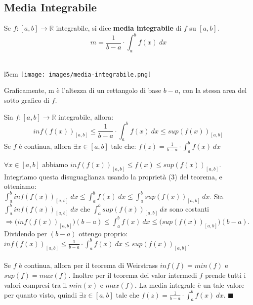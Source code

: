 \subsection{Media Integrabile}
\begin{definition}
Se $f: [a,b] \to \mathbb{R}$ integrabile, si dice \textbf{media integrabile} di $f$ su $[a,b]$.
\vspace{-10pt}
\[m = \frac{1}{b-a} \cdot \int_a^b f(x) \:dx\]\\
\end{definition}
\begin{wrapfigure}[2]{l}{5cm}
\vspace{-45pt}
    \centering
    \texttt{[image: images/media-integrabile.png]}
\end{wrapfigure}
\vspace{-10pt}
Graficamente, m è l'altezza di un rettangolo di base $b-a$, con la stessa area del sotto grafico di $f$.
\vspace{15pt}
\begin{theorem}
Sia $f:[a,b] \to \mathbb{R}$ integrabile, allora:
\vspace{-5pt}
\[inf(f(x))_{[a,b]} \leq \frac{1}{b-a} \cdot \int_a^b f(x) \:dx \leq sup(f(x))_{[a,b]}\]
Se $f$ è continua, allora $\exists x \in [a,b]$ tale che:
$f(z) = \frac{1}{b-a} \cdot \int_a^b f(x) \:dx$
\end{theorem}

\begin{demostration}
$\forall x \in [a,b]$ abbiamo $inf(f(x))_{[a,b]} \leq f(x) \leq sup(f(x))_{[a,b]}$. Integriamo questa disuguaglianza usando la proprietà (3) del teorema, e otteniamo:\\
$\int_a^b inf(f(x))_{[a,b]}\:dx \leq \int_a^b f(x)\:dx \leq \int_a^b sup(f(x))_{[a,b]}\:dx$. Sia $\int_a^b inf(f(x))_{[a,b]}\:dx$ che $\int_a^b sup(f(x))_{[a,b]}\:dx$ sono costanti $\Longrightarrow \big( inf(f(x))_{[a,b]} \big)(b-a) \leq \int_a^b f(x)\:dx \leq \big( sup(f(x))_{[a,b]} \big)(b-a)$.\\
Dividendo per $(b-a)$ ottengo proprio: $inf(f(x))_{[a,b]} \leq \frac{1}{b-a} \cdot \int_a^b f(x) \:dx \leq sup(f(x))_{[a,b]}$.\\\\
Se $f$ è continua, allora per il teorema di Weirstrass $inf(f) = min(f)$ e $sup(f) = max(f)$. Inoltre per il teorema dei valor intermedi $f$ prende tutti i valori compresi tra il $min(x)$ e $max(f)$. La media integrale è un tale valore per quanto visto, quindi $\exists z \in [a,b]$ tale che $f(z) = \frac{1}{b-a} \cdot \int_a^b f(x)\:dx$. $\blacksquare$
\end{demostration}

